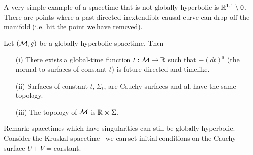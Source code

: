 \begin{exm}
    A very simple example of a spacetime that is not globally hyperbolic is $\mathbb{R}^{1,1}\setminus{0}$. There are points where a past-directed inextendible causal curve can drop off the manifold (i.e. hit the point we have removed).
\end{exm}
\begin{thm}[Wald]
    Let $(\mathcal{M},g)$ be a globally hyperbolic spacetime. Then
    \begin{enumerate}
        \item[(i)] There exists a global-time function $t:\mathcal{M} \to \mathbb{R}$ such that $-(dt)^a$ (the normal to surfaces of constant $t$) is future-directed and timelike.
        \item[(ii)] Surfaces of constant $t$, $\Sigma_t$, are Cauchy surfaces and all have the same topology.
        \item[(iii)] The topology of $\mathcal{M}$ is $\mathbb{R}\times \Sigma$.
    \end{enumerate}
\end{thm}
Remark: spacetimes which have singularities can still be globally hyperbolic. Consider the Kruskal spacetime-- we can set initial conditions on the Cauchy surface $U+V=$constant.

